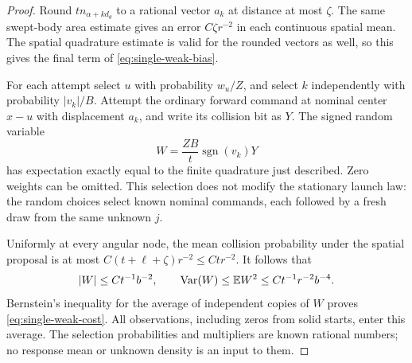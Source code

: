 \begin{proof}
Round $t n_{\alpha+kd_\theta}$ to a rational vector $a_k$ at distance
at most $\zeta$.  The same swept-body area estimate gives an error
$C\zeta r^{-2}$ in each continuous spatial mean.  The spatial
quadrature estimate is valid for the rounded vectors as well, so
this gives the final term of \eqref{eq:single-weak-bias}.

For each attempt select $u$ with probability $w_u/Z$, and select $k$
independently with probability $|v_k|/B$.  Attempt the ordinary
forward command at nominal center $x-u$ with displacement $a_k$, and
write its collision bit as $Y$.  The signed random variable
\begin{equation}\label{eq:single-weighted-observation}
                   W=\frac{ZB}{t}\operatorname{sgn}(v_k)Y
\end{equation}
has expectation exactly equal to the finite quadrature just described.
Zero weights can be omitted.  This selection does not modify the
stationary launch law: the random choices select known nominal
commands, each followed by a fresh draw from the same unknown $j$.

Uniformly at every angular node, the mean collision probability under
the spatial proposal is at most
$C(t+\ell+\zeta)r^{-2}\le Ct r^{-2}$.  It follows that
\begin{equation}\label{eq:single-weak-variance}
 |W|\le Ct^{-1}b^{-2},\qquad
 \operatorname{Var}(W)\le\mathbb E W^2\le Ct^{-1}r^{-2}b^{-4}.
\end{equation}
Bernstein's inequality for the average of independent copies of $W$
proves \eqref{eq:single-weak-cost}.  All observations, including zeros
from solid starts, enter this average.  The selection probabilities
and multipliers are known rational numbers; no response mean or
unknown density is an input to them.
\end{proof}


